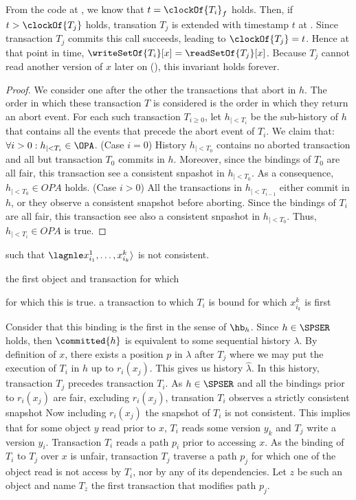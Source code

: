     From the code at , we know that $t=\clockOf{T_i}_f$ holds.
    Then, if $t > \clockOf{T_j}$ holds, transation $T_j$ is extended with timestamp $t$ at .
    Since transaction $T_j$ commits this call succeeds, leading to $\clockOf{T_j} = t$.
    Hence at that point in time, $\writeSetOf{T_i}[x] = \readSetOf{T_j}[x]$.
    Because $T_j$ cannot read another version of $x$ later on (), this invariant holds forever.


    \begin{proof}
  We consider one after the other the transactions that abort in $h$.
  The order in which these transaction $T$ is considered is the order in which they return an abort event.
  For each such transaction $T_{i \geq 0}$, let $h_{|<T_i}$ be the sub-history of $h$ that contains all the events that precede the abort event of $T_i$.
  We claim that: $\forall i > 0 : h_{|<T_i} \in \OPA$.
  (Case $i=0$)
  History $h_{|<T_0}$ contains no aborted transaction and all but transaction $T_0$ commits in $h$.
  Moreover, since the bindings of $T_0$ are all fair, this transaction see a consistent snpashot in $h_{|<T_0}$.
  As a consequence, $h_{|<T_0} \in OPA$ holds.
  (Case $i>0$)
  All the transactions in $h_{|<T_{i-1}}$ either commit in $h$, or they observe a consistent snapshot before aborting.
  Since the bindings of $T_i$ are all fair, this transaction see also a consistent snpashot in $h_{|<T_0}$.
  Thus, $h_{|<T_i} \in OPA$ is true.  
\end{proof}


      such that $\lagnle x^1_{i_1}, \ldots, x^k_{i_k} \rangle$ is not consistent.
  
  the first object and transaction for which 

  for which this is true.
  a transaction to which $T_i$ is bound for which $x^k_{i_k}$ is first 

    Consider that this binding is the first in the sense of $\hb_h$.
  Since $h \in \SPSER$ holds, then $\committed{h}$ is equivalent to some sequential history $\lambda$.
  By definition of $x$, there exists a position $p$ in $\lambda$ after $T_j$ where we may put the execution of $T_i$ in $h$ up to $r_i(x_j)$.
  This gives us history $\hat{\lambda}$.
  In this history, transaction $T_j$ precedes transaction $T_i$.
  As $h \in \SPSER$ and all the bindings prior to $r_i(x_j)$ are fair, excluding $r_i(x_j)$, transation $T_i$ observes a strictly consistent snapshot 
  Now including $r_i(x_j)$ the snapshot of $T_i$ is not consistent.
  This implies that for some object $y$ read prior to $x$, $T_i$ reads some version $y_k$ and $T_j$ write a version $y_i$.
  Transaction $T_i$ reads a path $p_i$ prior to accessing $x$.
  As the binding of $T_i$ to $T_j$ over $x$ is unfair, transaction $T_j$ traverse a path $p_j$ for which one of the object read is not access by $T_i$, nor by any of its dependencies.
  Let $z$ be such an object and name $T_z$ the first transaction that modifies path $p_j$.
